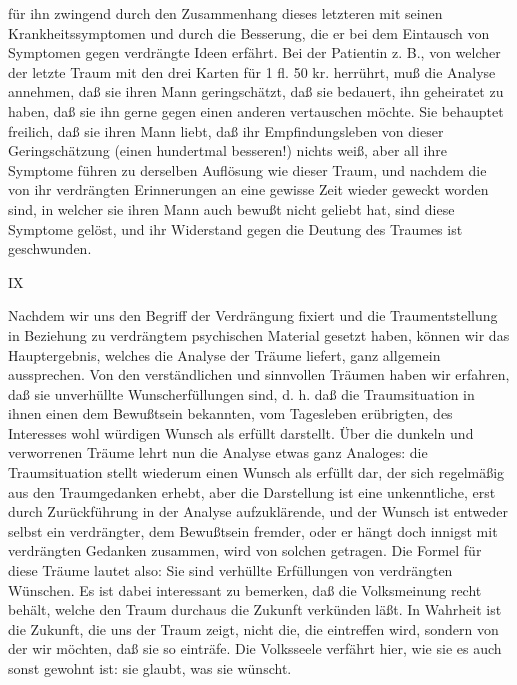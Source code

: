\documentclass{article}
\begin{document}
        \pstart
        für ihn zwingend durch den Zusammenhang dieses letzteren mit seinen
               Krankheitssymptomen und durch die Besserung, die er bei dem Eintausch von
               Symptomen gegen verdrängte Ideen erfährt. Bei der Patientin z. B., von welcher
               der letzte Traum mit den drei Karten für 1 fl. 50 kr. herrührt, muß die
               Analyse annehmen, daß sie ihren Mann geringschätzt, daß sie bedauert, ihn
               geheiratet zu haben, daß sie ihn gerne gegen einen anderen vertauschen möchte.
               Sie behauptet freilich, daß sie ihren Mann liebt, daß ihr Empfindungsleben von
               dieser Geringschätzung (einen hundertmal besseren!) nichts weiß, aber
               all ihre Symptome führen zu derselben Auflösung wie dieser Traum, und nachdem
               die von ihr verdrängten Erinnerungen an eine gewisse Zeit wieder geweckt
               worden sind, in welcher sie ihren Mann auch bewußt nicht geliebt hat, sind diese
               Symptome gelöst, und ihr Widerstand gegen die Deutung des Traumes ist
               geschwunden.
        \pend
    
         
            
            
            
        \pstart
        IX
        \pend
    
            
        \pstart
        Nachdem wir uns den Begriff der Verdrängung fixiert und die Traumentstellung in
               Beziehung zu verdrängtem psychischen Material gesetzt haben, können wir das
               Hauptergebnis, welches die Analyse der Träume liefert, ganz allgemein
               aussprechen. Von den verständlichen und sinnvollen Träumen haben wir
               erfahren, daß sie unverhüllte Wunscherfüllungen sind, d. h. daß die Traumsituation in ihnen einen dem Bewußtsein bekannten, vom Tagesleben erübrigten, des Interesses wohl würdigen Wunsch als erfüllt
               darstellt. Über die dunkeln und verworrenen Träume lehrt nun die Analyse etwas
               ganz Analoges: die Traumsituation stellt wiederum einen Wunsch als erfüllt dar,
               der sich regelmäßig aus den Traumgedanken erhebt, aber die
               Darstellung ist eine unkenntliche, erst durch Zurückführung in der Analyse
               aufzuklärende, und der Wunsch ist entweder selbst ein verdrängter,
               dem Bewußtsein fremder, oder er hängt doch innigst mit verdrängten Gedanken
               zusammen, wird von solchen getragen. Die Formel für diese Träume lautet also:
                  Sie sind verhüllte Erfüllungen von verdrängten Wünschen. Es
               ist dabei interessant zu bemerken, daß die Volksmeinung recht behält, welche den
               Traum durchaus die Zukunft verkünden läßt. In Wahrheit ist die Zukunft, die uns
               der Traum zeigt, nicht die, die eintreffen wird, sondern von der wir
               möchten, daß sie so einträfe. Die Volksseele verfährt hier, wie sie es auch
               sonst gewohnt ist: sie glaubt, was sie wünscht.
        \pend
    
\end{document}
